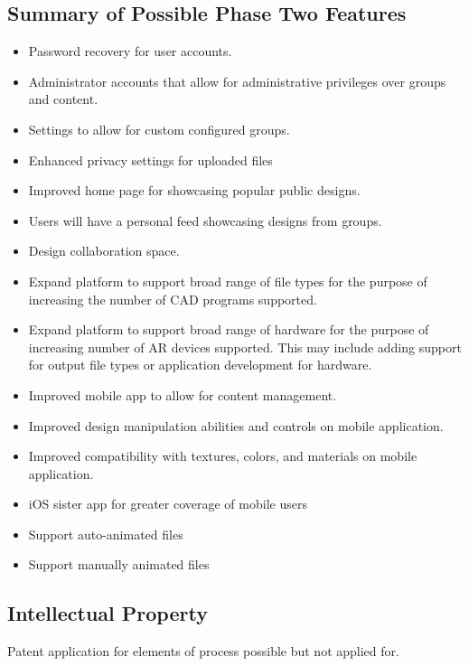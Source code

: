 \subsection{Summary of Possible Phase Two Features}
\begin{itemize}
	\item Password recovery for user accounts.
	\item Administrator accounts that allow for administrative privileges over groups and content. 
	\item Settings to allow for custom configured groups. 
	\item Enhanced privacy settings for uploaded files 
	\item Improved home page for showcasing popular public designs. 
	\item Users will have a personal feed showcasing designs from  groups.
	\item Design collaboration space. 
	\item Expand platform to support broad range of file types for the purpose of increasing the number of CAD programs supported. 
	\item Expand platform to support broad range of hardware for the purpose of increasing number of AR devices supported. This may include adding support for output file types or application development for hardware. 
	\item Improved mobile app to allow for content management. 
	\item Improved design manipulation abilities and controls on mobile application. 
	\item Improved compatibility with textures, colors, and materials on mobile application.
	\item iOS sister app for greater coverage of mobile users 
	\item Support auto-animated files 
	\item Support manually animated files
\end{itemize}


\subsection{Intellectual Property}
Patent application for elements of process possible but not applied for. 

